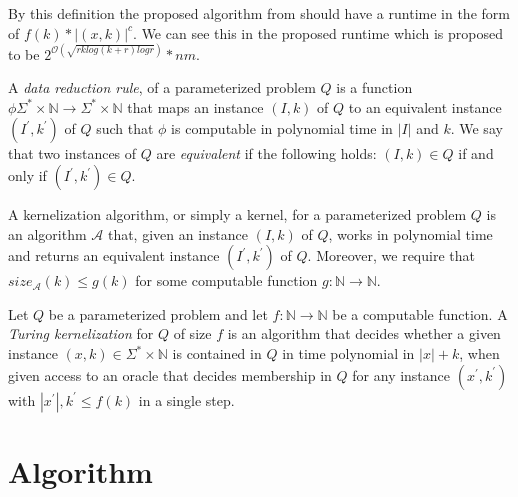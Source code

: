 \documentclass[a4paper]{article}
\begin{document}
By this definition the proposed algorithm from \cite{fomin_golovach_panolan_2020} should have
a runtime in the form of $f(k) * |(x,k)|^c$. We can see this in the proposed runtime which is
proposed to be $2^{\mathcal{O} (\sqrt{rk log(k+r) logr})}*nm$.

\begin{theoremdefinition}{\cite[p.~18]{param_algo_book}}
    A \textit{data reduction rule}, of a parameterized problem $Q$ is a function
    $\phi \Sigma^* \times \mathbb{N} \rightarrow \Sigma^* \times \mathbb{N}$
    that maps an instance $(I,k)$ of $Q$ to an equivalent
    instance $(I^\prime, k^\prime)$ of $Q$ such that $\phi$ is computable in polynomial time
    in $|I|$ and $k$. We say that two instances of $Q$ are \textit{equivalent} if the following
    holds: $(I,k) \in Q$ if and only if $(I^\prime, k^\prime) \in Q$.
\end{theoremdefinition}

\begin{theoremdefinition}{\cite[p.~18]{param_algo_book} \label{def:kernelization}}
    A kernelization algorithm, or simply a kernel, for a parameterized problem $Q$
    is an algorithm $\mathcal{A}$ that, given an instance $(I,k)$ of $Q$, works in polynomial
    time and returns an equivalent instance $(I^\prime, k^\prime)$ of $Q$. Moreover, we require
    that $size_{\mathcal{A}}(k) \leq g(k)$ for some computable function
    $g: \mathbb{N} \rightarrow \mathbb{N}$.
\end{theoremdefinition}

\begin{theoremdefinition}{\cite[p.~314]{param_algo_book} \label{def:turing-kernelization}}
    Let $Q$ be a parameterized problem and let $f:\mathbb{N} \rightarrow \mathbb{N} $
    be a computable function. A \textit{Turing kernelization} for $Q$ of size $f$ is an
    algorithm that decides whether a given instance $(x,k) \in \Sigma^* \times \mathbb{N}$
    is contained in $Q$ in time polynomial in $|x|+k$, when given access to an oracle
    that decides membership in $Q$ for any instance $(x^\prime, k^\prime)$ with
    $|x^\prime|,k^\prime \leq f(k)$ in a single step.
\end{theoremdefinition}

%
%

\newpage

\section{Algorithm}
\label{sec:algo}
\end{document}
